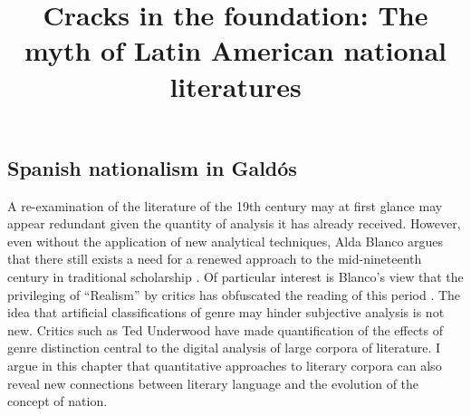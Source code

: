\documentclass[12pt]{report}
\title{Cracks in the foundation: The myth of Latin American national literatures}
\begin{document}

\begin{singlespace}
	\chapter{Spanish nationalism in Galdós}
\end{singlespace}

A re-examination of the literature of the 19th century may at first glance may appear redundant given the quantity of analysis it has already received. 
However, even without the application of new analytical techniques, Alda Blanco argues that there still exists a need for a renewed approach to the mid-nineteenth century in traditional scholarship \cite[423]{Blanco2000}.
Of particular interest is Blanco's view that the privileging of \enquote{Realism} by critics has obfuscated the reading of this period \cite[433]{Blanco2000}.
The idea that artificial classifications of genre may hinder subjective analysis is not new.
Critics such as Ted Underwood have made quantification of the effects of genre distinction central to the digital analysis of large corpora of literature.
I argue in this chapter that quantitative approaches to literary corpora can also reveal new connections between literary language and the evolution of the concept of nation. 
\end{document}
